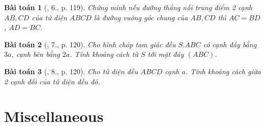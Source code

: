 \documentclass{article}
\numberwithin{equation}{section}
\newtheorem{baitoan}{Bài toán}
\begin{document}
\begin{baitoan}[\cite{SGK_Toan_11_hinh_hoc_co_ban}, 6., p. 119]
	Chứng minh nếu đường thẳng nối trung điểm 2 cạnh $AB,CD$ của tứ diện $ABCD$ là đường vuông góc chung của $AB,CD$ thì $AC = BD$, $AD = BC$.
\end{baitoan}

\begin{baitoan}[\cite{SGK_Toan_11_hinh_hoc_co_ban}, 7., p. 120]
	Cho hình chóp tam giác đều $S.ABC$ có cạnh đáy bằng $3a$, cạnh bên bằng $2a$. Tính khoảng cách từ $S$ tới mặt đáy $(ABC)$.
\end{baitoan}

\begin{baitoan}[\cite{SGK_Toan_11_hinh_hoc_co_ban}, 8., p. 120]
	Cho tứ diện đều $ABCD$ cạnh $a$. Tính khoảng cách giữa 2 cạnh đối của tứ diện đều đó.
\end{baitoan}


\section{Miscellaneous}


\printbibliography[heading=bibintoc]
	
\end{document}
